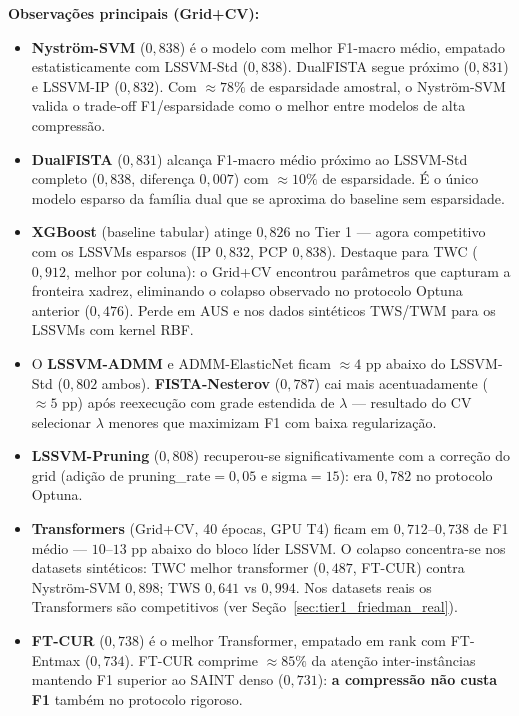 \documentclass[12pt,a4paper]{article}
\begin{document}
\textbf{Observações principais (Grid+CV):}
\begin{itemize}
  \item \textbf{Nyström-SVM} ($0{,}838$) é o modelo com melhor F1-macro médio,
        empatado estatisticamente com LSSVM-Std ($0{,}838$). DualFISTA segue
        próximo ($0{,}831$) e LSSVM-IP ($0{,}832$). Com $\approx 78\%$ de
        esparsidade amostral, o Nyström-SVM valida o trade-off F1/esparsidade
        como o melhor entre modelos de alta compressão.
  \item \textbf{DualFISTA} ($0{,}831$) alcança F1-macro médio próximo ao
        LSSVM-Std completo ($0{,}838$, diferença $0{,}007$) com
        $\approx 10\%$ de esparsidade. É o único modelo esparso da família dual
        que se aproxima do baseline sem esparsidade.
  \item \textbf{XGBoost} (baseline tabular) atinge $0{,}826$ no Tier 1 ---
        agora competitivo com os LSSVMs esparsos (IP $0{,}832$, PCP $0{,}838$).
        Destaque para TWC ($0{,}912$, melhor por coluna): o Grid+CV encontrou
        parâmetros que capturam a fronteira xadrez, eliminando o colapso
        observado no protocolo Optuna anterior ($0{,}476$). Perde em AUS e nos
        dados sintéticos TWS/TWM para os LSSVMs com kernel RBF.
  \item O \textbf{LSSVM-ADMM} e ADMM-ElasticNet ficam $\approx 4$ pp abaixo do
        LSSVM-Std ($0{,}802$ ambos). \textbf{FISTA-Nesterov} ($0{,}787$) cai
        mais acentuadamente ($\approx 5$ pp) após reexecução com grade estendida
        de $\lambda$ --- resultado do CV selecionar $\lambda$ menores que
        maximizam F1 com baixa regularização.
  \item \textbf{LSSVM-Pruning} ($0{,}808$) recuperou-se significativamente
        com a correção do grid (adição de pruning\_rate$=0{,}05$ e sigma$=15$):
        era $0{,}782$ no protocolo Optuna.
  \item \textbf{Transformers} (Grid+CV, 40 épocas, GPU T4) ficam em
        $0{,}712$--$0{,}738$ de F1 médio --- $10$--$13$ pp abaixo do bloco
        líder LSSVM. O colapso concentra-se nos datasets sintéticos: TWC melhor
        transformer ($0{,}487$, FT-CUR) contra Nyström-SVM $0{,}898$; TWS
        $0{,}641$ vs $0{,}994$. Nos datasets reais os Transformers são
        competitivos (ver Seção~\ref{sec:tier1_friedman_real}).
  \item \textbf{FT-CUR} ($0{,}738$) é o melhor Transformer, empatado em rank
        com FT-Entmax ($0{,}734$). FT-CUR comprime $\approx 85\%$ da atenção
        inter-instâncias mantendo F1 superior ao SAINT denso ($0{,}731$):
        \textbf{a compressão não custa F1} também no protocolo rigoroso.
\end{itemize}
\end{document}
